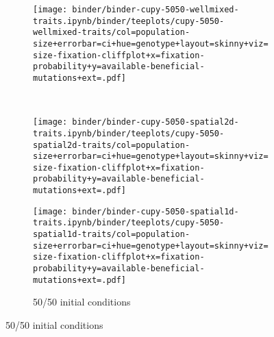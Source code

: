 \begin{figure}[h]
\begin{minipage}{\textwidth}
    \begin{subfigure}[b]{\linewidth}
        \begin{minipage}{0.3\textwidth}
          \texttt{[image: binder/binder-cupy-5050-wellmixed-traits.ipynb/binder/teeplots/cupy-5050-wellmixed-traits/col=population-size+errorbar=ci+hue=genotype+layout=skinny+viz=size-fixation-cliffplot+x=fixation-probability+y=available-beneficial-mutations+ext=.pdf]}%
        \end{minipage}%
        \begin{minipage}{0.06\textwidth}
          ~
        \end{minipage}%
        \begin{minipage}{0.26\textwidth}
          \texttt{[image: binder/binder-cupy-5050-spatial2d-traits.ipynb/binder/teeplots/cupy-5050-spatial2d-traits/col=population-size+errorbar=ci+hue=genotype+layout=skinny+viz=size-fixation-cliffplot+x=fixation-probability+y=available-beneficial-mutations+ext=.pdf]}%
        \end{minipage}%
        \begin{minipage}{0.25\textwidth}
          \texttt{[image: binder/binder-cupy-5050-spatial1d-traits.ipynb/binder/teeplots/cupy-5050-spatial1d-traits/col=population-size+errorbar=ci+hue=genotype+layout=skinny+viz=size-fixation-cliffplot+x=fixation-probability+y=available-beneficial-mutations+ext=.pdf]}%
        \end{minipage}%
      \begin{minipage}{0.12\textwidth}
        \raggedright
        \large
        \caption{50/50 initial conditions}
        \label{fig:spatial-structure:5050}
        \vspace{20ex}
      \end{minipage}%
    \end{subfigure}%

    \vspace{-10ex}


\end{minipage}
\end{figure}
